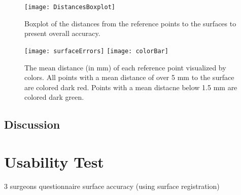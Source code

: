 \begin{figure}[H]
  \centering
 \texttt{[image: DistancesBoxplot]}
 \caption{Boxplot of the distances from the reference points to the surfaces to present overall accuracy.}
  \label{fig:surfaceDistances}
\end{figure}

\begin{figure}[H]
  \centering
 \texttt{[image: surfaceErrors]}
  \endminipage
  \hfill
 \texttt{[image: colorBar]}
  \endminipage
  \hfill
 \caption{The mean distance (in mm) of each reference point visualized by colors. All
   points with a mean distance of over 5 mm to the surface are colored dark red.
   Points with a mean distacne below 1.5 mm are colored dark green.}
  \label{fig:surfaceErrors}
\end{figure}


\subsection{Discussion}



\section{Usability Test}
3 surgeons
questionnaire
surface accuracy (using surface registration)
